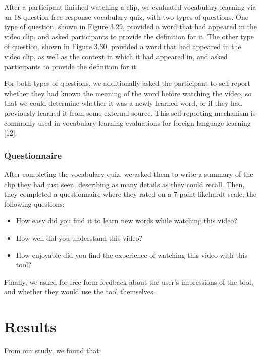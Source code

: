 \documentclass{sigchi}
\begin{document}
After a participant finished watching a clip, we evaluated vocabulary learning via an 18-question free-response vocabulary quiz, with two types of questions. One type of question, shown in Figure 3.29, provided a word that had appeared in the video clip, and asked participants to provide the definition for it. The other type of question, shown in Figure 3.30, provided a word that had appeared in the video clip, as well as the context in which it had appeared in, and asked participants to provide the definition for it.

For both types of questions, we additionally asked the participant to self-report whether they had known the meaning of the word before watching the video, so that we could determine whether it was a newly learned word, or if they had previously learned it from some external source. This self-reporting mechanism is commonly used in vocabulary-learning evaluations for foreign-language learning [12].

\subsubsection{Questionnaire}

After completing the vocabulary quiz, we asked them to write a summary of the clip they had
just seen, describing as many details as they could recall. Then, they completed
a questionnaire where they rated on a 7-point likehardt scale, the following questions:

\begin{itemize}[noitemsep]
\item How easy did you find it to learn new words while watching this video?
\item How well did you understand this video?
\item How enjoyable did you find the experience of watching this video with this tool?
\end{itemize}

Finally, we asked for free-form feedback about the user's impressions of the tool, and whether they would use the tool themselves.

\section{Results}

From our study, we found that:
\end{document}
